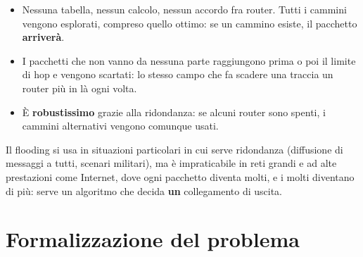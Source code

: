 \begin{itemize}
    \item Nessuna tabella, nessun calcolo, nessun accordo fra router. Tutti i cammini vengono esplorati, compreso quello
          ottimo: se un cammino esiste, il pacchetto \textbf{arriverà}.
    \item I pacchetti che non vanno da nessuna parte raggiungono prima o poi il limite di hop e vengono scartati: lo stesso
          campo che fa scadere una traccia un router più in là ogni volta.
    \item È \textbf{robustissimo} grazie alla ridondanza: se alcuni router sono spenti, i cammini alternativi vengono comunque usati.
\end{itemize}

Il flooding si usa in situazioni particolari in cui serve ridondanza (diffusione di messaggi a tutti, scenari militari),
ma è impraticabile in reti grandi e ad alte prestazioni come Internet, dove ogni pacchetto diventa molti, e i molti diventano
di più: serve un algoritmo che decida \textbf{un} collegamento di uscita.

\section{Formalizzazione del problema}


